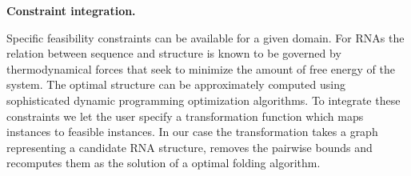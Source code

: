 \documentclass{article}
\begin{document}




\textbf{Constraint integration.}

Specific feasibility constraints can be available for a given domain. For RNAs
the relation between sequence and structure is known to be governed by
thermodynamical forces that seek to minimize the amount of free energy of the
system. The optimal structure can be approximately computed using
sophisticated dynamic programming optimization algorithms. To integrate these
constraints we let the user specify a transformation function which maps instances to feasible instances. In our case the transformation takes a graph representing a candidate RNA structure, removes the pairwise bounds and recomputes them as the solution of a optimal folding algorithm.
\end{document}
